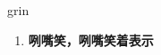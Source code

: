 
\begin{frame}
{\huge grin}
\begin{center}
\begin{enumerate}\Large
  \item \textbf{咧嘴笑，咧嘴笑着表示}
\end{enumerate}
\end{center}
\end{frame}
